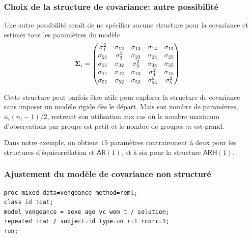 \documentclass{beamer}
\begin{document}
\begin{frame}[fragile]
\frametitle{Choix de la structure de covariance: autre possibilité}
\bi
\item Une autre possibilité serait de ne spécifier aucune structure pour la covariance et estimer tous les paramètres du modèle
\[
\boldsymbol {\Sigma}_i=
  \begin{pmatrix}
  \sigma^2_1 & \sigma_{12} & \sigma_{13} & \sigma_{14} & \sigma_{15} \\
   \sigma_{21} & \sigma_2^2  & \sigma_{23} & \sigma_{24} & \sigma_{25}\\
  \sigma_{31} & \sigma_{32} & \sigma^2_3 & \sigma_{34} & \sigma_{35}\\
   \sigma_{41} & \sigma_{42} & \sigma_{43} & \sigma_{4}^2 & \sigma_{45}\\
    \sigma_{51} & \sigma_{52} & \sigma_{53} & \sigma_{54}^2 & \sigma_{5}^2\\
    \end{pmatrix}
\]

\item Cette structure peut parfois être utile pour explorer la structure de covariance
sans imposer un modèle rigide dès le départ. Mais son nombre de paramètres, $n_i(n_i-1)/2$, restreint son utilisation aux cas où le nombre maximum d'observations par groupe est petit et le nombre de groupes $m$ est grand.
\item Dans notre exemple, on obtient $15$ paramètres contrairement à deux pour les structures d'équicorrélation et $\mathsf{AR}(1)$, et à
six pour la structure $\mathsf{ARH}(1)$. 
\ei
\end{frame}

\begin{frame}[fragile]
\frametitle{Ajustement du modèle de covariance non structuré}
 
\begin{tcolorbox}[colback=white, colframe=hecblue, title=Code \SASlang{} pour ajuster un modèle non structuré]
\begin{verbatim}
proc mixed data=vengeance method=reml;
class id tcat;
model vengeance = sexe age vc wom t / solution;
repeated tcat / subject=id type=un r=1 rcorr=1;
run;
\end{verbatim}
\end{tcolorbox}
\end{frame}
\end{document}
